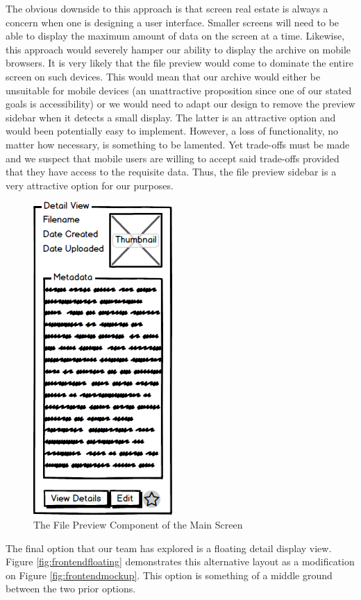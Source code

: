 \documentclass[12pt]{article}
\begin{document}
The obvious downside to this approach is that screen real estate is always a concern when one is designing a user interface. Smaller screens will need to be able to display the maximum amount of data on the screen at a time. Likewise, this approach would severely hamper our ability to display the archive on mobile browsers. It is very likely that the file preview would come to dominate the entire screen on such devices. This would mean that our archive would either be unsuitable for mobile devices (an unattractive proposition since one of our stated goals is accessibility) or we would need to adapt our design to remove the preview sidebar when it detects a small display. The latter is an attractive option and would been potentially easy to implement. However, a loss of functionality, no matter how necessary, is something to be lamented. Yet trade-offs must be made and we suspect that mobile users are willing to accept said trade-offs provided that they have access to the requisite data. Thus, the file preview sidebar is a very attractive option for our purposes.

\begin{figure}[h]
	\centering
	\includegraphics[scale=0.5]{frontend_file_preview}
	\caption{The File Preview Component of the Main Screen}
	\label{fig:frontendfilepreview}
\end{figure}

The final option that our team has explored is a floating detail display view. Figure \ref{fig:frontendfloating} demonstrates this alternative layout as a modification on Figure \ref{fig:frontendmockup}. This option is something of a middle ground between the two prior options.
\end{document}
